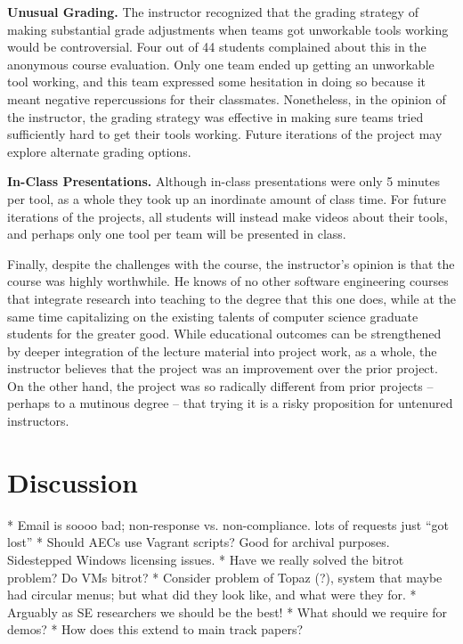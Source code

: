 \documentclass[10pt,conference]{IEEEtran}
\begin{document}
\textbf{Unusual Grading.} 
	The instructor recognized that the grading strategy of making substantial
	grade adjustments when teams got unworkable tools working would be 
	controversial.
	Four out of 44 students complained about this in the anonymous course
	evaluation.
	Only one team ended up getting an unworkable tool working, and this team expressed
	some hesitation in doing so because it meant negative repercussions for their
	classmates.
	Nonetheless, in the opinion of the instructor, the grading strategy was effective
	in making sure teams tried sufficiently hard to get their tools working. 
 	Future iterations of the project may explore alternate grading options.

\textbf{In-Class Presentations.}
  	Although in-class presentations were only 5 minutes per tool, as a whole they
  	took up an inordinate amount of class time.
  	For future iterations of the projects, all students will instead make videos 
  	about their tools, and perhaps only one tool per team will be presented
  	in class.
 
\vspace{3mm}
Finally, despite the challenges with the course, the instructor's opinion is that 
the course was highly worthwhile.
He knows of no other software engineering courses that integrate research into 
teaching to the degree that this one does, while at the same time capitalizing
on the existing talents of computer science graduate students for the greater 
good.
While educational outcomes can be strengthened by deeper integration of the lecture
material into project work, as a whole, the instructor believes that 
the project was an improvement over the prior project.
On the other hand, the project was so radically different from prior 
projects -- perhaps to a mutinous degree -- that trying it is a risky 
proposition for untenured instructors.

\section{Discussion}

* Email is soooo bad; non-response vs. non-compliance. lots of requests just ``got lost''
* Should AECs use Vagrant scripts? Good for archival purposes. Sidestepped Windows licensing issues.
* Have we really solved the bitrot problem? Do VMs bitrot?
* Consider problem of Topaz (?), system that maybe had circular menus; but what did they look like, and what were they for.
* Arguably as SE researchers we should be the best!
* What should we require for demos?
* How does this extend to main track papers?
\end{document}
